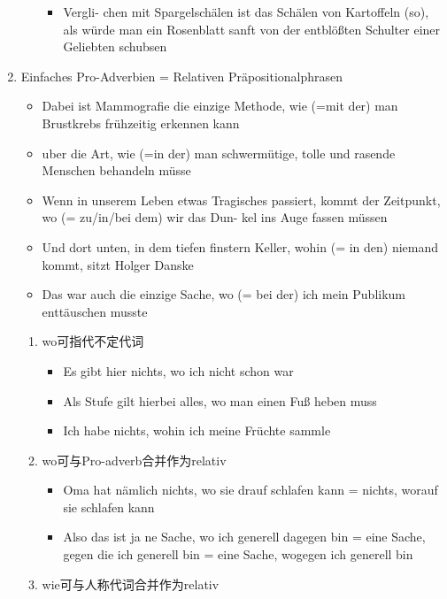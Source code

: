 \documentclass[UTF8]{report}
\begin{document}
\begin{enumerate}
\begin{enumerate}
\begin{itemize}
            \item Vergli- chen mit Spargelschälen ist das Schälen von Kartoffeln (so), als würde man ein Rosenblatt sanft von der entblößten Schulter einer Geliebten schubsen
        \end{itemize}
    \end{enumerate}
    \item Einfaches Pro-Adverbien = Relativen Präpositionalphrasen
        \begin{itemize}
            \item Dabei ist Mammografie die einzige Methode, wie (=mit der) man Brustkrebs frühzeitig erkennen kann
            \item uber die Art, wie (=in der) man schwermütige, tolle und rasende Menschen behandeln müsse
            \item Wenn in unserem Leben etwas Tragisches passiert, kommt der Zeitpunkt, wo (= zu/in/bei dem) wir das Dun- kel ins Auge fassen müssen
            \item Und dort unten, in dem tiefen finstern Keller, wohin (= in den) niemand kommt, sitzt Holger Danske
            \item Das war auch die einzige Sache, wo (= bei der) ich mein Publikum enttäuschen musste
        \end{itemize}
    \begin{enumerate}
        \item wo可指代不定代词
        \begin{itemize}
            \item Es gibt hier nichts, wo ich nicht schon war
            \item Als Stufe gilt hierbei alles, wo man einen Fuß heben muss
            \item Ich habe nichts, wohin ich meine Früchte sammle
        \end{itemize}
        \item wo可与Pro-adverb合并作为relativ
        \begin{itemize}
            \item Oma hat nämlich nichts, wo sie drauf schlafen kann = nichts, worauf sie schlafen kann
            \item Also das ist ja ne Sache, wo ich generell dagegen bin = eine Sache, gegen die ich generell bin = eine Sache, wogegen ich generell bin
        \end{itemize}
        \item wie可与人称代词合并作为relativ
        \begin{itemize}

\end{itemize}
\end{enumerate}
\end{enumerate}
\end{document}
